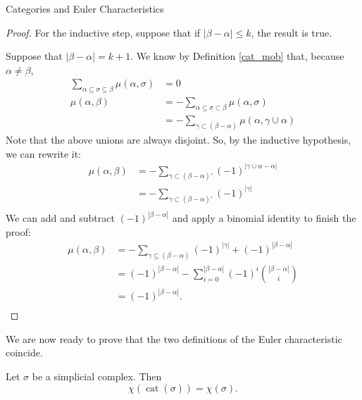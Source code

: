 \documentclass[12pt]{pom_thesis}
\DeclareMathOperator{\cat}{cat}
\begin{document}
\begin{chapter}{Categories and Euler Characteristics}
\begin{proof}
For the inductive step, suppose that if $|\beta-\alpha| \leq k$, the result is true.

Suppose that $|\beta - \alpha| = k+1$. We know by Definition \ref{cat_mob} that, because $\alpha \neq \beta$,
 \begin{align*}
\sum_{\alpha \subseteq \sigma \subseteq \beta} \mu(\alpha, \sigma)&= 0\\
\mu(\alpha, \beta) &=  - \sum_{\alpha \subseteq \sigma \subset \beta} \mu(\alpha, \sigma)\\
&= - \sum_{\gamma \subset (\beta - \alpha)} \mu(\alpha, \gamma \cup \alpha) 
\end{align*}
Note that the above unions are always disjoint. So, by the inductive hypothesis, we can rewrite it:
\begin{align*}
\mu(\alpha, \beta) &= - \sum_{\gamma \subset (\beta - \alpha)'} (-1)^{|\gamma \cup \alpha - \alpha|} \\ %
&= - \sum_{\gamma \subset (\beta - \alpha)'} (-1)^{|\gamma|}\\ %
\end{align*}
We can add and subtract $(-1)^{|\beta - \alpha|}$ and apply a binomial identity to finish the proof:
\begin{align*}
\mu(\alpha, \beta) &= - \sum_{\gamma \subseteq (\beta - \alpha)} (-1)^{|\gamma|} + (-1)^{|\beta - \alpha|} \\ 
&= (-1)^{|\beta - \alpha|} -  \sum_{i = 0}^{|\beta - \alpha|}(-1)^i{|\beta- \alpha| \choose i}\\ 
&= (-1)^{|\beta - \alpha|} .\\ 
\end{align*}
\end{proof}
We are now ready to prove that the two definitions of the Euler characteristic coincide.
\begin{thm}
\label{consistentEuler}
Let $\sigma$ be a simplicial complex. Then 
\[
\chi(\cat(\sigma)) = \chi(\sigma).
\]


\end{thm}
\end{chapter}
\end{document}
